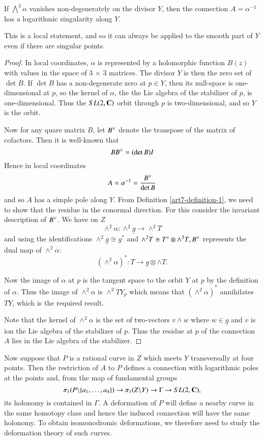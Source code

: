 \begin{prop}\label{art7-proposition-2}
If $\bigwedge^{3}\alpha$ vanishes non-degenerately on the divisor $Y$, then the connection $A = \alpha^{-1}$ has a logarithmic singularity along $Y$.
\end{prop}

This is a local statement, and so it can always be applied to the smooth part of $Y$ even if there are singular points.

\begin{proof}
In local coordinates, $\alpha$ is represented by a holomorphic function $B(z)$ with values in the space of 3 $\times$ 3 matrices. The divisor $Y$ is then the zero set of $\det B$. If $\det B$ has a non-degenerate zero at $p \in Y$, then its null-space is one-dimensional at $p$, so the kernel of $\alpha$, the the Lie algebra of the stabilizer of $p$, is one-dimensional. Thus the $SL(2, \mathbf{C})$ orbit through $p$ is two-dimensional, and so $Y$ is the orbit.

Now for any quare matrix $B$, let $B\spcheck$ denote the transpose of the matrix of cofactors. Then it is well-known that
$$
BB\spcheck = (\det B)I
$$
Hence in local coordinates
$$
A = \alpha^{-1} = \dfrac{B\spcheck}{\det B}
$$
and so $A$ has a simple pole along $Y$. From Definition \ref{art7-definition-1}, we need to show that the residue in the conormal direction. For this consider the invariant description of $B\spcheck$. We have on $Z$
$$
\wedge^{2} \alpha : \wedge^{2}\underline{g} \rightarrow \wedge^{2}T
$$ 
and using the identifications $\wedge^{2}\underline{g} \cong \underline{g}^{*}$ and $\wedge^{2}T \cong T^{*} \otimes \wedge^{3}T, B\spcheck$ represents the dual map of $\wedge^{2}\alpha$:
$$
(\wedge^{2}\alpha)^{*} : T\rightarrow \underline{g} \otimes \wedge T.
$$

Now the image of $\alpha$ at $p$ is the tangent space to the orbit $Y$ at $p$ by the definition of $\alpha$. Thus the image of $\wedge^{2} \alpha$ is $\wedge^{2}TY_{p}$ which means that $ (\wedge^{2}\alpha)^{*}$ annihilates $TY$, which is the required result.

Note that the kernel of $\wedge^{2}\alpha$ is the set of two-vectors $v \wedge w$ where $w \in \underline{g}$ and $v$ is ion the Lie algebra of the stabilizer of $p$. Thus the residue at $p$ of the connection $A$ lies in the Lie algebra of the stabilizer.
\end{proof}

Now suppose that $P$ is a rational curve in $Z$ which meets $Y$ transversally at four points. Then the restriction of $A$ to $P$ defines a connection with logarithmic poles at the points and, from the map of fundamental groups
$$
\pi_{1}(P\backslash \{a_{1},\ldots, a_{4}\})\rightarrow \pi_{1}(Z\backslash Y)\rightarrow \Gamma \rightarrow SL(2, \mathbf{C}),
$$
its holonomy is contained in $\Gamma$. A deformation of $P$ will define a nearby curve in the same homotopy class and hence the induced connection will have the same holonomy. To obtain isomonodromic deformations, we therefore need to study the deformation theory of such curves.

